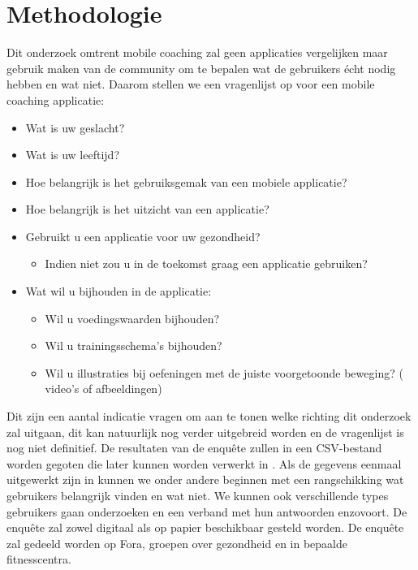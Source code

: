 


\section{Methodologie}
\label{sec:methodologie}
Dit onderzoek omtrent mobile coaching zal geen applicaties vergelijken maar gebruik maken van de community om te bepalen wat de gebruikers écht nodig hebben en wat niet. Daarom stellen we een vragenlijst op voor een mobile coaching applicatie: 
\begin{itemize}
\item Wat is uw geslacht?
\item Wat is uw leeftijd?
\item Hoe belangrijk is het gebruiksgemak van een mobiele applicatie?
\item Hoe belangrijk is het uitzicht van een applicatie?
\item Gebruikt u een applicatie voor uw gezondheid?
\begin{itemize}
\item Indien niet zou u in de toekomst graag een applicatie gebruiken?
\end{itemize}
\item Wat wil u bijhouden in de applicatie:
\begin{itemize}
\item Wil u voedingswaarden bijhouden?
\item Wil u trainingsschema's bijhouden?
\item Wil u illustraties bij oefeningen met de juiste voorgetoonde beweging? ( video's of afbeeldingen) 
\end{itemize}
\end{itemize}
Dit zijn een aantal indicatie vragen om aan te tonen welke richting dit onderzoek zal uitgaan, dit kan natuurlijk nog verder uitgebreid worden en de vragenlijst is nog niet definitief. De resultaten van de enquête zullen in een CSV-bestand worden gegoten die later kunnen worden verwerkt in \textcite{RStudio} .
 Als de gegevens eenmaal uitgewerkt zijn in \textcite{RStudio} kunnen we onder andere  beginnen met een rangschikking wat gebruikers belangrijk vinden en wat niet. We kunnen ook verschillende types gebruikers gaan onderzoeken en een verband met hun antwoorden enzovoort.\hfill \break \break
 De enquête zal zowel digitaal als op papier beschikbaar gesteld worden. De enquête zal gedeeld worden op Fora, \textcite{Facebook} groepen over gezondheid en in bepaalde fitnesscentra.

